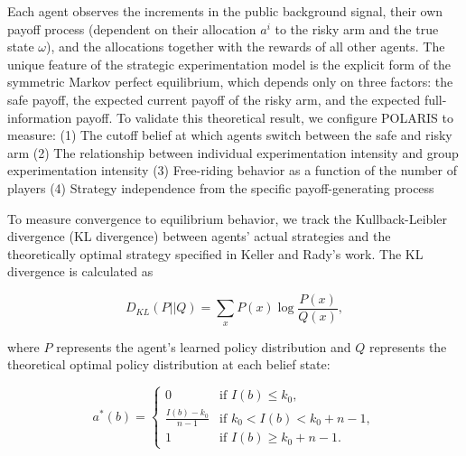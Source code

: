Each agent observes the increments in the public background signal, their own payoff process (dependent on their allocation $a^i$ to the risky arm and the true state $\omega$), and the allocations together with the rewards of all other agents. The unique feature of the strategic experimentation model is the explicit form of the symmetric Markov perfect equilibrium, which depends only on three factors: the safe payoff, the expected current payoff of the risky arm, and the expected full-information payoff. To validate this theoretical result, we configure POLARIS to measure: (1) The cutoff belief at which agents switch between the safe and risky arm
(2) The relationship between individual experimentation intensity and group experimentation intensity
(3) Free-riding behavior as a function of the number of players
(4) Strategy independence from the specific payoff-generating process
\iffalse
    For experimental validation, we implement three distinct payoff-generating processes that preserve the same reward statistics: pure Brownian motion with unknown drift, pure Poisson processes with unknown intensity, and mixed Lévy processes with both continuous and jump components. In all three cases, the theory predicts identical equilibrium strategies when expressed in terms of the incentive to experiment $I(\pi) = \frac{f(\pi)-s}{s-m(\pi)}$ when $m(\pi) < s$, and $I(\pi) = \infty$ otherwise, where $\pi$ represents the belief state.
\fi
To measure convergence to equilibrium behavior, we track the Kullback-Leibler divergence (KL divergence) between agents' actual strategies and the theoretically optimal strategy specified in Keller and Rady's work. The KL divergence is calculated as

\begin{equation}
    D_{KL}(P||Q) = \sum_{x} P(x) \log\frac{P(x)}{Q(x)},
\end{equation}

where $P$ represents the agent's learned policy distribution and $Q$ represents the theoretical optimal policy distribution at each belief state:

\begin{equation}
    a^*(b) =
    \begin{cases}
        0                    & \text{if } I(b) \leq k_0,            \\
        \frac{I(b)-k_0}{n-1} & \text{if } k_0 < I(b) < k_0 + n - 1, \\
        1                    & \text{if } I(b) \geq k_0 + n - 1.
    \end{cases}
\end{equation}

